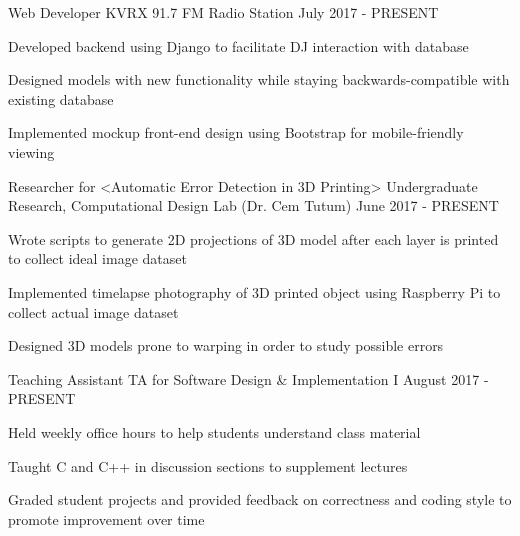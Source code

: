 

\begin{cventries}

  \cventry
    {Web Developer} %
    {KVRX 91.7 FM Radio Station} %
    {} %
    {July 2017 - PRESENT} %
    {
      \begin{cvitems} %
        \item {Developed backend using Django to facilitate DJ interaction with database}
        \item {Designed models with new functionality while staying backwards-compatible with existing database}
        \item {Implemented mockup front-end design using Bootstrap for mobile-friendly viewing}
      \end{cvitems}
    }

  \cventry
    {Researcher for <Automatic Error Detection in 3D Printing>} %
    {Undergraduate Research, Computational Design Lab (Dr. Cem Tutum)} %
    {} %
    {June 2017 - PRESENT} %
    {
      \begin{cvitems} %
        \item {Wrote scripts to generate 2D projections of 3D model after each layer is printed to collect ideal image dataset}
        \item {Implemented timelapse photography of 3D printed object using Raspberry Pi to collect actual image dataset}
        \item {Designed 3D models prone to warping in order to study possible errors}
      \end{cvitems}
    }

  \cventry
    {Teaching Assistant} %
    {TA for Software Design \& Implementation I} %
    {} %
    {August 2017 - PRESENT} %
    {
      \begin{cvitems} %
        \item {Held weekly office hours to help students understand class material}
        \item {Taught C and C++ in discussion sections to supplement lectures}
        \item {Graded student projects and provided feedback on correctness and coding style to promote improvement over time}
      \end{cvitems}
    }

\end{cventries}
